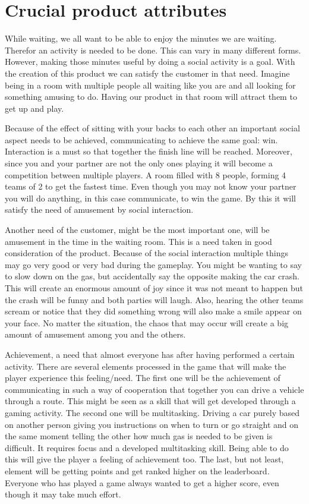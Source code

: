 \documentclass[12pt,twoside,a4paper]{article}
\begin{document}
\section{Crucial product attributes}
While waiting, we all want to be able to enjoy the minutes we are waiting. Therefor an activity is needed to be done. This can vary in many different forms. However, making those minutes useful by doing a social activity is a goal. With the creation of this product we can satisfy the customer in that need. Imagine being in a room with multiple people all waiting like you are and all looking for something amusing to do. Having our product in that room will attract them to get up and play. \newline

Because of the effect of sitting with your backs to each other an important social aspect needs to be achieved, communicating to achieve the same goal: win. Interaction is a must so that together the finish line will be reached. Moreover, since you and your partner are not the only ones playing it will become a competition between multiple players. A room filled with 8 people, forming 4 teams of 2 to get the fastest time. Even though you may not know your partner you will do anything, in this case communicate, to win the game.  By this it will satisfy the need of amusement by social interaction. \newline

Another need of the customer, might be the most important one, will be amusement in the time in the waiting room. This is a need taken in good consideration of the product. Because of the social interaction multiple things may go very good or very bad during the gameplay. You might be wanting to say to slow down on the gas, but accidentally say the opposite making the car crash. This will create an enormous amount of joy since it was not meant to happen but the crash will be funny and both parties will laugh. Also, hearing the other teams scream or notice that they did something wrong will also make a smile appear on your face. No matter the situation, the chaos that may occur will create a big amount of amusement among you and the others. \newline

Achievement, a need that almost everyone has after having performed a certain activity. There are several elements processed in the game that will make the player experience this feeling/need. The first one will be the achievement of communicating in such a way of cooperation that together you can drive a vehicle through a route. This might be seen as a skill that will get developed through a gaming activity. The second one will be multitasking. Driving a car purely based on another person giving you instructions on when to turn or go straight and on the same moment telling the other how much gas is needed to be given is difficult. It requires focus and a developed multitasking skill. Being able to do this will give the player a feeling of achievement too. The last, but not least, element will be getting points and get ranked higher on the leaderboard. Everyone who has played a game always wanted to get a higher score, even though it may take much effort. \newline
\end{document}
